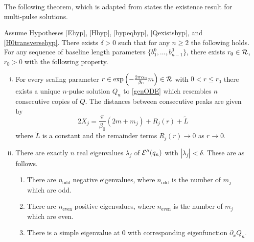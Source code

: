 \documentclass[thesis.tex]{subfiles}
\begin{document}
The following theorem, which is adapted from \cite[Theorem 3.6]{SandstedeStrut} states the existence result for multi-pulse solutions.

\begin{theorem}\label{multipulseexistR}
Assume Hypotheses \ref{Ehyp}, \ref{Hhyp}, \ref{hypeqhyp}, \ref{Qexistshyp}, and \ref{H0transversehyp}. There exists $\delta > 0$ such that for any $n \geq 2$ the following holds. For any sequence of baseline length parameters $\{ b_1^0, \dots, b_{n-1}^0 \}$, there exists $r_0 \in \mathcal{R}$, $r_0 > 0$ with the following property.
\begin{enumerate}[(i)]
\item For every scaling parameter $r \in \mathop\mathrm{exp}\nolimits\left(-\frac{2 \pi \alpha_0}{\beta_0}m \right) \in \mathcal{R}$ with $0 < r \leq r_0$ there exists a unique $n$-pulse solution $Q_n$ to \cref{genODE} which resembles $n$ consecutive copies of $Q$. The distances between consecutive peaks are given by
\[
2 X_j = \frac{\pi}{\beta_0}(2 m + m_j) + R_j(r) + \tilde{L}
\]
where $\tilde{L}$ is a constant and the remainder terms $R_j(r) \rightarrow 0$ as $r \rightarrow 0$.

\item There are exactly $n$ real eigenvalues $\lambda_j$ of $\mathcal{E}''(q_n)$ with $|\lambda_j| < \delta$. These are as follows.
\begin{enumerate}
	\item There are $n_{\text{odd}}$ negative eigenvalues, where $n_{\text{odd}}$ is the number of $m_j$ which are odd.
	\item There are $n_{\text{even}}$ positive eigenvalues, where $n_{\text{even}}$ is the number of $m_j$ which are even.
	\item There is a simple eigenvalue at 0 with corresponding eigenfunction $\partial_x Q_n$.
\end{enumerate}


\end{enumerate}
\end{theorem}
\end{document}

